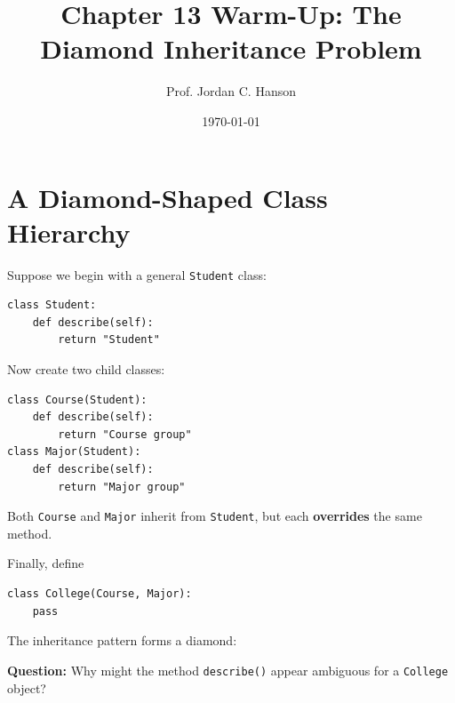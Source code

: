 \documentclass[11pt]{article}
\begin{document}
\twocolumn

\title{Chapter 13 Warm-Up: The Diamond Inheritance Problem}
\author{Prof. Jordan C. Hanson}
\date{\today}
\maketitle

\section{A Diamond-Shaped Class Hierarchy}

Suppose we begin with a general \texttt{Student} class:

\begin{verbatim}
class Student:
    def describe(self):
        return "Student"
\end{verbatim}

Now create two child classes:

\begin{verbatim}
class Course(Student):
    def describe(self):
        return "Course group"
class Major(Student):
    def describe(self):
        return "Major group"
\end{verbatim}

Both \texttt{Course} and \texttt{Major} inherit from \texttt{Student}, but each \textbf{overrides} the same method.

Finally, define

\begin{verbatim}
class College(Course, Major):
    pass
\end{verbatim}

The inheritance pattern forms a diamond:

\begin{center}
\end{center}

\textbf{Question:} Why might the method
\texttt{describe()} appear ambiguous for a
\texttt{College} object?
\end{document}

